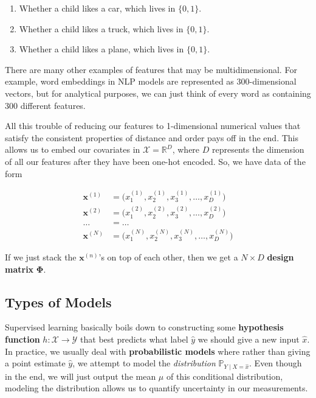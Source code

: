 \documentclass{article}
\theoremstyle{definition}
\begin{document}
  \begin{enumerate}
    \item Whether a child likes a car, which lives in $\{0, 1\}$. 
    \item Whether a child likes a truck, which lives in $\{0, 1\}$. 
    \item Whether a child likes a plane, which lives in $\{0, 1\}$. 
  \end{enumerate}

  There are many other examples of features that may be multidimensional. For example, word embeddings in NLP models are represented as 300-dimensional vectors, but for analytical purposes, we can just think of every word as containing 300 different features. 

  All this trouble of reducing our features to 1-dimensional numerical values that satisfy the consistent properties of distance and order pays off in the end. This allows us to embed our covariates in $\mathcal{X} = \mathbb{R}^D$, where $D$ represents the dimension of all our features after they have been one-hot encoded. So, we have data of the form

  \begin{align*} 
    \mathbf{x}^{(1)} & = \big(x^{(1)}_1, x^{(1)}_2, x^{(1)}_3, \ldots, x^{(1)}_D \big) \\
    \mathbf{x}^{(2)} & = \big(x^{(2)}_1, x^{(2)}_2, x^{(2)}_3, \ldots, x^{(2)}_D \big) \\
    \ldots & = \ldots \\
    \mathbf{x}^{(N)} & = \big(x^{(N)}_1, x^{(N)}_2, x^{(N)}_3, \ldots, x^{(N)}_D \big) 
  \end{align*}

  If we just stack the $\mathbf{x}^{(n)}$'s on top of each other, then we get a $N \times D$ \textbf{design matrix} $\boldsymbol{\Phi}$. 

  \subsection{Types of Models}

    Supervised learning basically boils down to constructing some \textbf{hypothesis function} $h: \mathcal{X} \rightarrow \mathcal{Y}$ that best predicts what label $\hat{y}$ we should give a new input $\hat{x}$. In practice, we usually deal with \textbf{probabilistic models} where rather than giving a point estimate $\hat{y}$, we attempt to model the \textit{distribution} $\mathbb{P}_{Y \mid X = \hat{x}}$. Even though in the end, we will just output the mean $\mu$ of this conditional distribution, modeling the distribution allows us to quantify uncertainty in our measurements. 
\end{document}
